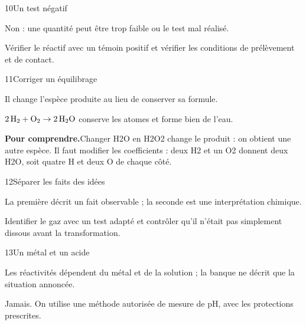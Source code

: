 \par\noindent\begin{minipage}{\linewidth}
\begin{corrige}{10}{Un test négatif}
\begin{questions}
\item Non : une quantité peut être trop faible ou le test mal réalisé.
\item Vérifier le réactif avec un témoin positif et vérifier les conditions de prélèvement et de contact.
\end{questions}
\end{corrige}
\end{minipage}
\par\noindent\begin{minipage}{\linewidth}
\begin{corrige}{11}{Corriger un équilibrage}
\begin{questions}
\item Il change l’espèce produite au lieu de conserver sa formule.
\item $2\,\ce{H2}+\ce{O2}\rightarrow2\,\ce{H2O}$ conserve les atomes et forme bien de l’eau.
\end{questions}
\par\smallskip\noindent\textbf{Pour comprendre.}\enspace Changer H2O en H2O2 change le produit : on obtient une autre espèce. Il faut modifier les coefficients : deux H2 et un O2 donnent deux H2O, soit quatre H et deux O de chaque côté.\par
{}
\end{corrige}
\end{minipage}
\par\noindent\begin{minipage}{\linewidth}
\begin{corrige}{12}{Séparer les faits des idées}
\begin{questions}
\item La première décrit un fait observable ; la seconde est une interprétation chimique.
\item Identifier le gaz avec un test adapté et contrôler qu’il n’était pas simplement dissous avant la transformation.
\end{questions}
\end{corrige}
\end{minipage}
\par\noindent\begin{minipage}{\linewidth}
\begin{corrige}{13}{Un métal et un acide}
\begin{questions}
\item Les réactivités dépendent du métal et de la solution ; la banque ne décrit que la situation annoncée.
\item Jamais. On utilise une méthode autorisée de mesure de pH, avec les protections prescrites.
\end{questions}
\end{corrige}
\end{minipage}
